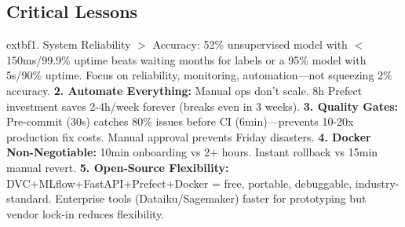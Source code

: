 \documentclass[11pt,a4paper]{article}
\begin{document}
\subsection{Critical Lessons}

	extbf{1. System Reliability $>$ Accuracy:} 52\% unsupervised model with $<$150ms/99.9\% uptime beats waiting months for labels or a 95\% model with 5s/90\% uptime. Focus on reliability, monitoring, automation—not squeezing 2\% accuracy. \textbf{2. Automate Everything:} Manual ops don't scale. 8h Prefect investment saves 2-4h/week forever (breaks even in 3 weeks). \textbf{3. Quality Gates:} Pre-commit (30s) catches 80\% issues before CI (6min)—prevents 10-20x production fix costs. Manual approval prevents Friday disasters. \textbf{4. Docker Non-Negotiable:} 10min onboarding vs 2+ hours. Instant rollback vs 15min manual revert. \textbf{5. Open-Source Flexibility:} DVC+MLflow+FastAPI+Prefect+Docker = free, portable, debuggable, industry-standard. Enterprise tools (Dataiku/Sagemaker) faster for prototyping but vendor lock-in reduces flexibility.
\end{document}
